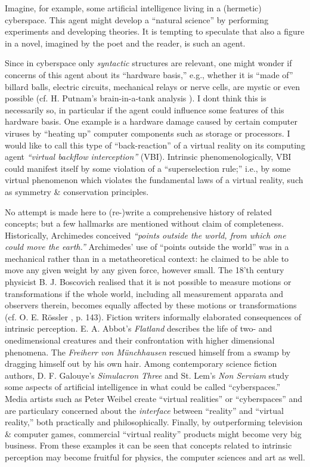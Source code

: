 \documentclass{article}
\begin{document}
 Imagine, for example,  some artificial intelligence living in a
 (hermetic) cyberspace.
 This agent
 might develop a ``natural science''
 by performing experiments and developing
 theories.
 It is tempting to speculate that also a figure in a novel,
 imagined by the poet and the reader, is such an agent.

  Since in cyberspace only {\em
 syntactic} structures are relevant, one might wonder if concerns of
 this agent about its ``hardware basis,'' e.g., whether it
 is ``made of'' billard balls, electric circuits, mechanical relays
 or nerve cells,
 are mystic or even possible (cf. H. Putnam's
brain-\-in-\-a-\-tank analysis \cite{putnam:81}).
 I dont think this is necessarily so, in particular if the agent could
 influence some features of this hardware basis.
One example is a hardware damage caused by certain computer viruses
by ``heating up'' computer components such as
storage or processors.
I would like to call this type of ``back-reaction'' of a virtual reality
on its computing agent {\em ``virtual backflow interception''} (VBI).
Intrinsic
phenomenologically, VBI could manifest itself by some violation of a
``superselection rule;'' i.e., by some virtual phenomenon which violates
the fundamental laws of a virtual reality, such as symmetry \&
conservation principles.



 No attempt is made here to (re-)write
 a comprehensive history of related concepts;
 but
 a few hallmarks are mentioned without claim of completeness.
 Historically,
 Archimedes conceived {\em ``points
 outside the world, from which one could move the earth.''}
 Archimedes' use of ``points outside the world'' was in a
 mechanical rather than in a metatheoretical context:
 he claimed to be able to move any given weight by any given
 force, however small.
The 18'th century physicist B. J. Boscovich  realised that
it is not possible to measure motions or transformations if the whole
world, including all measurement apparata and observers therein, becomes
equally affected by these motions or transformations
(cf. O. E. R\"ossler \cite{roessler-92}, p. 143).
 Fiction writers
 informally elaborated consequences of intrinsic perception.
 E. A.
 Abbot's  {\sl Flatland}  describes the life
 of two- and onedimensional creatures and their confrontation with
 higher dimensional phenomena.
 The {\it Freiherr von M\"unchhausen}  rescued himself from a
 swamp by dragging himself out by his own hair.
 Among contemporary science fiction authors, D. F. Galouye's {\sl
 Simulacron Three} and St. Lem's {\sl Non Serviam} study some aspects
 of artificial intelligence in what could be called ``cyberspaces.''
 Media artists such as Peter Weibel create ``virtual realities''  or
``cyberspaces'' and  are particulary concerned about the
{\em interface} between ``reality'' and ``virtual reality,''
both practically and philosophically.
Finally, by outperforming television \& computer
games, commercial
``virtual reality'' products might become very big business.
From these examples it can be seen that concepts related to intrinsic
perception may become fruitful for physics, the computer sciences and
art as well.
\end{document}
